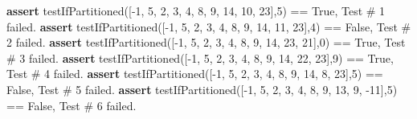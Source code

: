 \documentclass[
]{article}
\newenvironment{Shaded}{}{}
\newcommand{\ControlFlowTok}[1]{\textcolor[rgb]{0.00,0.44,0.13}{\textbf{#1}}}
\newcommand{\DecValTok}[1]{\textcolor[rgb]{0.25,0.63,0.44}{#1}}
\newcommand{\NormalTok}[1]{#1}
\newcommand{\OperatorTok}[1]{\textcolor[rgb]{0.40,0.40,0.40}{#1}}
\newcommand{\StringTok}[1]{\textcolor[rgb]{0.25,0.44,0.63}{#1}}
\newcommand{\VariableTok}[1]{\textcolor[rgb]{0.10,0.09,0.49}{#1}}
\begin{document}
\begin{Shaded}
\begin{Highlighting}[]
\ControlFlowTok{assert}\NormalTok{ testIfPartitioned([}\OperatorTok{{-}}\DecValTok{1}\NormalTok{, }\DecValTok{5}\NormalTok{, }\DecValTok{2}\NormalTok{, }\DecValTok{3}\NormalTok{, }\DecValTok{4}\NormalTok{, }\DecValTok{8}\NormalTok{, }\DecValTok{9}\NormalTok{, }\DecValTok{14}\NormalTok{, }\DecValTok{10}\NormalTok{, }\DecValTok{23}\NormalTok{],}\DecValTok{5}\NormalTok{) }\OperatorTok{==} \VariableTok{True}\NormalTok{, }\StringTok{\textquotesingle{} Test \# 1 failed.\textquotesingle{}}
\ControlFlowTok{assert}\NormalTok{ testIfPartitioned([}\OperatorTok{{-}}\DecValTok{1}\NormalTok{, }\DecValTok{5}\NormalTok{, }\DecValTok{2}\NormalTok{, }\DecValTok{3}\NormalTok{, }\DecValTok{4}\NormalTok{, }\DecValTok{8}\NormalTok{, }\DecValTok{9}\NormalTok{, }\DecValTok{14}\NormalTok{, }\DecValTok{11}\NormalTok{, }\DecValTok{23}\NormalTok{],}\DecValTok{4}\NormalTok{) }\OperatorTok{==} \VariableTok{False}\NormalTok{, }\StringTok{\textquotesingle{} Test \# 2 failed.\textquotesingle{}}
\ControlFlowTok{assert}\NormalTok{ testIfPartitioned([}\OperatorTok{{-}}\DecValTok{1}\NormalTok{, }\DecValTok{5}\NormalTok{, }\DecValTok{2}\NormalTok{, }\DecValTok{3}\NormalTok{, }\DecValTok{4}\NormalTok{, }\DecValTok{8}\NormalTok{, }\DecValTok{9}\NormalTok{, }\DecValTok{14}\NormalTok{, }\DecValTok{23}\NormalTok{, }\DecValTok{21}\NormalTok{],}\DecValTok{0}\NormalTok{) }\OperatorTok{==} \VariableTok{True}\NormalTok{, }\StringTok{\textquotesingle{} Test \# 3 failed.\textquotesingle{}}
\ControlFlowTok{assert}\NormalTok{ testIfPartitioned([}\OperatorTok{{-}}\DecValTok{1}\NormalTok{, }\DecValTok{5}\NormalTok{, }\DecValTok{2}\NormalTok{, }\DecValTok{3}\NormalTok{, }\DecValTok{4}\NormalTok{, }\DecValTok{8}\NormalTok{, }\DecValTok{9}\NormalTok{, }\DecValTok{14}\NormalTok{, }\DecValTok{22}\NormalTok{, }\DecValTok{23}\NormalTok{],}\DecValTok{9}\NormalTok{) }\OperatorTok{==} \VariableTok{True}\NormalTok{, }\StringTok{\textquotesingle{} Test \# 4 failed.\textquotesingle{}}
\ControlFlowTok{assert}\NormalTok{ testIfPartitioned([}\OperatorTok{{-}}\DecValTok{1}\NormalTok{, }\DecValTok{5}\NormalTok{, }\DecValTok{2}\NormalTok{, }\DecValTok{3}\NormalTok{, }\DecValTok{4}\NormalTok{, }\DecValTok{8}\NormalTok{, }\DecValTok{9}\NormalTok{, }\DecValTok{14}\NormalTok{, }\DecValTok{8}\NormalTok{, }\DecValTok{23}\NormalTok{],}\DecValTok{5}\NormalTok{) }\OperatorTok{==} \VariableTok{False}\NormalTok{, }\StringTok{\textquotesingle{} Test \# 5 failed.\textquotesingle{}}
\ControlFlowTok{assert}\NormalTok{ testIfPartitioned([}\OperatorTok{{-}}\DecValTok{1}\NormalTok{, }\DecValTok{5}\NormalTok{, }\DecValTok{2}\NormalTok{, }\DecValTok{3}\NormalTok{, }\DecValTok{4}\NormalTok{, }\DecValTok{8}\NormalTok{, }\DecValTok{9}\NormalTok{, }\DecValTok{13}\NormalTok{, }\DecValTok{9}\NormalTok{, }\OperatorTok{{-}}\DecValTok{11}\NormalTok{],}\DecValTok{5}\NormalTok{) }\OperatorTok{==} \VariableTok{False}\NormalTok{, }\StringTok{\textquotesingle{} Test \# 6 failed.\textquotesingle{}}

\end{Highlighting}
\end{Shaded}
\end{document}
